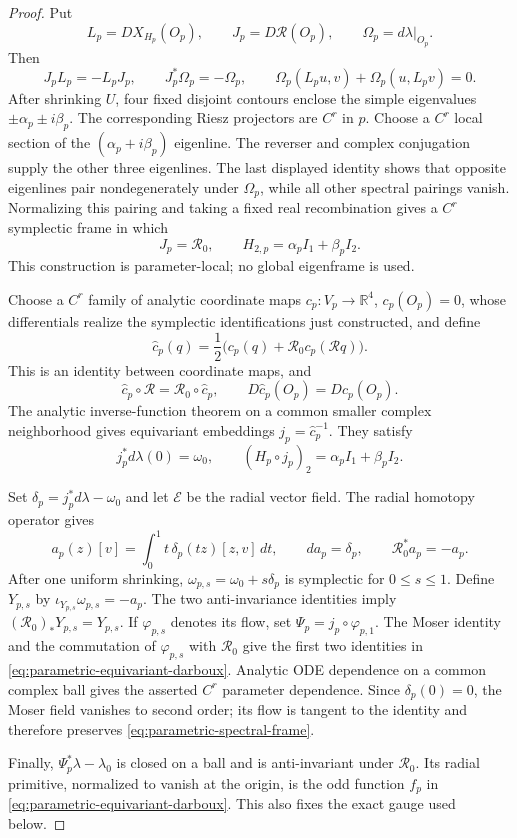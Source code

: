 \documentclass[11pt]{amsart}
\numberwithin{equation}{section}
\theoremstyle{definition}
\theoremstyle{remark}
\begin{document}
\begin{proof}
Put
\[
 L_p=DX_{H_p}(O_p),\qquad J_p=D\mathcal R(O_p),\qquad
 \Omega_p=d\lambda|_{O_p}.
\]
Then
\[
 J_pL_p=-L_pJ_p,\qquad J_p^*\Omega_p=-\Omega_p,
 \qquad
 \Omega_p(L_pu,v)+\Omega_p(u,L_pv)=0.
\]
After shrinking $U$, four fixed disjoint contours enclose the simple
eigenvalues $\pm\alpha_p\pm i\beta_p$.  The corresponding Riesz projectors
are $C^r$ in $p$.  Choose a $C^r$ local section of the
$(\alpha_p+i\beta_p)$ eigenline.  The reverser and complex conjugation
supply the other three eigenlines.  The last displayed identity shows that
opposite eigenlines pair nondegenerately under $\Omega_p$, while all other
spectral pairings vanish.  Normalizing this pairing and taking a fixed real
recombination gives a $C^r$ symplectic frame in which
\begin{equation}\label{eq:parametric-spectral-frame}
 J_p=\mathcal R_0,\qquad H_{2,p}=\alpha_pI_1+\beta_pI_2.
\end{equation}
This construction is parameter-local; no global eigenframe is used.

Choose a $C^r$ family of analytic coordinate maps
$c_p:V_p\to\mathbb R^4$, $c_p(O_p)=0$, whose differentials realize the
symplectic identifications just constructed, and define
\[
 \widehat c_p(q)
 =\frac12\bigl(c_p(q)+\mathcal R_0c_p(\mathcal Rq)\bigr).
\]
This is an identity between coordinate maps, and
\[
 \widehat c_p\circ\mathcal R=\mathcal R_0\circ\widehat c_p,
 \qquad D\widehat c_p(O_p)=Dc_p(O_p).
\]
The analytic inverse-function theorem on a common smaller complex
neighborhood gives equivariant embeddings $j_p=\widehat c_p^{-1}$.  They
satisfy
\[
 j_p^*d\lambda(0)=\omega_0,\qquad
 (H_p\circ j_p)_2=\alpha_pI_1+\beta_pI_2.
\]

Set $\delta_p=j_p^*d\lambda-\omega_0$ and let $\mathcal E$ be the radial
vector field.  The radial homotopy operator gives
\[
 a_p(z)[v]=\int_0^1t\,\delta_p(tz)[z,v]\,dt,\qquad
 da_p=\delta_p,\qquad \mathcal R_0^*a_p=-a_p.
\]
After one uniform shrinking,
 $\omega_{p,s}=\omega_0+s\delta_p$ is symplectic for
 $0\le s\le1$.  Define $Y_{p,s}$ by
 $\iota_{Y_{p,s}}\omega_{p,s}=-a_p$.  The two anti-invariance identities
 imply $(\mathcal R_0)_*Y_{p,s}=Y_{p,s}$.  If $\varphi_{p,s}$ denotes its
 flow, set $\Psi_p=j_p\circ\varphi_{p,1}$.  The Moser identity and the
 commutation of $\varphi_{p,s}$ with $\mathcal R_0$ give the first two
 identities in
 \eqref{eq:parametric-equivariant-darboux}.  Analytic ODE dependence on a
 common complex ball gives the asserted $C^r$ parameter dependence.  Since
 $\delta_p(0)=0$, the Moser field vanishes to second order; its flow is
 tangent to the identity and therefore preserves
 \eqref{eq:parametric-spectral-frame}.

Finally, $\Psi_p^*\lambda-\lambda_0$ is closed on a ball and is
anti-invariant under $\mathcal R_0$.  Its radial primitive, normalized to
vanish at the origin, is the odd function $f_p$ in
\eqref{eq:parametric-equivariant-darboux}.  This also fixes the exact gauge
used below.
\end{proof}
\end{document}
